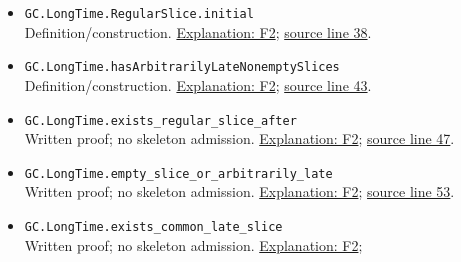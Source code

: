 \documentclass[
  letterpaper,
  11pt]{article}
\begin{document}
\begin{itemize}
  Definition/construction. \hyperref[f2-slices]{Explanation: F2};
  \href{https://github.com/qinz1yang/differential-geometry-dev/blob/ea0fae60ee01ef8c8d9b57a51794c6538f679c5d/DifferentialGeometry/Geometry/Flow/RicciFlow/LongTime/RegularSlice.lean\#L35}{source
  line 35}.
\item
  {\small\texttt{GC.\allowbreak{}Long\allowbreak{}Time.\allowbreak{}Regular\allowbreak{}Slice.\allowbreak{}initial}}\\
  Definition/construction. \hyperref[f2-slices]{Explanation: F2};
  \href{https://github.com/qinz1yang/differential-geometry-dev/blob/ea0fae60ee01ef8c8d9b57a51794c6538f679c5d/DifferentialGeometry/Geometry/Flow/RicciFlow/LongTime/RegularSlice.lean\#L38}{source
  line 38}.
\item
  {\small\texttt{GC.\allowbreak{}Long\allowbreak{}Time.\allowbreak{}has\allowbreak{}Arbitrarily\allowbreak{}Late\allowbreak{}Nonempty\allowbreak{}Slices}}\\
  Definition/construction. \hyperref[f2-slices]{Explanation: F2};
  \href{https://github.com/qinz1yang/differential-geometry-dev/blob/ea0fae60ee01ef8c8d9b57a51794c6538f679c5d/DifferentialGeometry/Geometry/Flow/RicciFlow/LongTime/RegularSlice.lean\#L43}{source
  line 43}.
\item
  {\small\texttt{GC.\allowbreak{}Long\allowbreak{}Time.\allowbreak{}exists\_\allowbreak{}regular\_\allowbreak{}slice\_\allowbreak{}after}}\\
  Written proof; no skeleton admission.
  \hyperref[f2-slices]{Explanation: F2};
  \href{https://github.com/qinz1yang/differential-geometry-dev/blob/ea0fae60ee01ef8c8d9b57a51794c6538f679c5d/DifferentialGeometry/Geometry/Flow/RicciFlow/LongTime/RegularSlice.lean\#L47}{source
  line 47}.
\item
  {\small\texttt{GC.\allowbreak{}Long\allowbreak{}Time.\allowbreak{}empty\_\allowbreak{}slice\_\allowbreak{}or\_\allowbreak{}arbitrarily\_\allowbreak{}late}}\\
  Written proof; no skeleton admission.
  \hyperref[f2-slices]{Explanation: F2};
  \href{https://github.com/qinz1yang/differential-geometry-dev/blob/ea0fae60ee01ef8c8d9b57a51794c6538f679c5d/DifferentialGeometry/Geometry/Flow/RicciFlow/LongTime/RegularSlice.lean\#L53}{source
  line 53}.
\item
  {\small\texttt{GC.\allowbreak{}Long\allowbreak{}Time.\allowbreak{}exists\_\allowbreak{}common\_\allowbreak{}late\_\allowbreak{}slice}}\\
  Written proof; no skeleton admission.
  \hyperref[f2-slices]{Explanation: F2};

\end{itemize}
\end{document}
